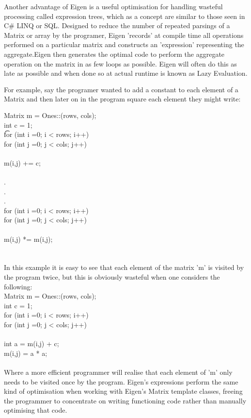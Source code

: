 \documentclass[a4paper]{amsart}
\begin{document}
Another advantage of Eigen is a useful optimisation for handling wasteful processing called expression trees, which as a concept are similar to those seen in C\# LINQ or SQL. Designed to reduce the number of repeated parsings of a Matrix or array by the programer, Eigen 'records' at compile time all operations performed on a particular matrix and constructs an 'expression' representing the aggregate.Eigen then generates the optimal code to perform the aggregate operation on the matrix in as few loops as possible. Eigen will often do this as late as possible and when done so at actual runtime is known as Lazy Evaluation.

For example, say the programer wanted to add a constant to each element of a Matrix and then later on in the program square each element they might write:


Matrix m = Ones::(rows, cols);\\
int c = 1;\\
\t for (int i =0; i < rows; i++)\\
	for (int j =0; j < cols; j++)\\
	{\\
		m(i,j)	+= c;\\
	}\\
.\\
.\\
.\\
for (int i =0; i < rows; i++)\\
	for (int j =0; j < cols; j++)\\
	{\\
		m(i,j)	*= m(i,j);\\
	}\\
\\


In this example it is easy to see that each element of the matrix 'm' is visited by the program twice, but this is obviously wasteful when one considers the following:\\

Matrix m = Ones::(rows, cols);\\
int c = 1;\\
for (int i =0; i < rows; i++)\\
	for (int j =0; j < cols; j++)\\
	{\\
		int a  = m(i,j)	+ c;\\
		m(i,j) = a * a;\\
	}\\

Where a more efficient programmer will realise that each element of 'm' only needs to be visited once by the program. Eigen's expressions perform the same kind of optimisation when working with Eigen's Matrix template classes, freeing the programmer to concentrate on writing functioning code rather than manually optimising that code.
\end{document}
